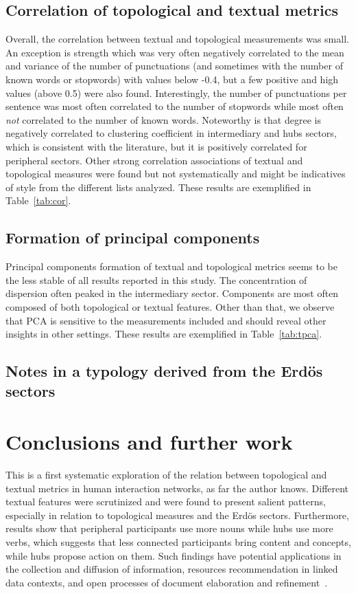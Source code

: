 \documentclass[review]{elsarticle}
\begin{document}
\subsection{Correlation of topological and textual metrics}\label{subsec:cor}
Overall, the correlation between textual and topological measurements was small. 
An exception is strength which was very often negatively correlated to the mean and variance of the number
of punctuations (and sometimes with the number of known words or stopwords) with values below -0.4, but a few positive and high values (above 0.5) were also found.
Interestingly, the number of punctuations per sentence was most often correlated to the number of stopwords
while most often \emph{not} correlated to the number of known words.
Noteworthy is that degree is negatively correlated to clustering coefficient in intermediary and hubs sectors,
which is consistent with the literature, but it is positively correlated for
peripheral sectors.
Other strong correlation associations of textual and topological measures were found
but not systematically and might be indicatives of style from the different lists analyzed.
These results are exemplified in Table~\ref{tab:cor}.

\FloatBarrier
\subsection{Formation of principal components}\label{subsec:pc}
Principal components formation of textual and topological metrics
seems to be the less stable of all results reported in this study.
The concentration of dispersion often peaked in the intermediary sector.
Components are most often composed of both topological or textual features.
Other than that, we observe that PCA is sensitive to the measurements included
and should reveal other insights in other settings.
These results are exemplified in Table~\ref{tab:tpca}.


\subsection{Notes in a typology derived from the Erd\"os sectors}

\section{Conclusions and further work}
This is a first systematic exploration of the relation between topological and textual
metrics in human interaction networks, as far the author knows.
Different textual features were scrutinized and were found to present
salient patterns, especially in relation to topological measures and the Erd\"os sectors.
Furthermore, results show that peripheral participants use more nouns while hubs use more verbs,
which suggests that less connected participants bring content and concepts,
while hubs propose action on them.
Such findings have potential applications in the collection and diffusion of information,
resources recommendation in linked data contexts,
and open processes of document elaboration and refinement~\cite{ensaio,ops,opa,stab,pnud4,pnud3}.
\end{document}
